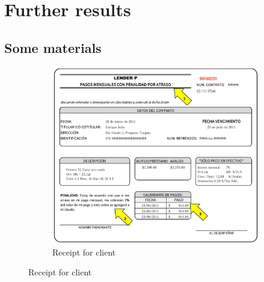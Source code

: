\documentclass[oneside,11pt]{article}
\begin{document}
\begingroup
\let\clearpage\relax
\tableofcontents
\endgroup


\newpage



\section{ Further results}
\vspace{.2in}


\subsection{Some materials}

\vspace{.1in}
\begin{figure}[H]
     \caption{Contract Terms Summary, and Promise Slip}
    \label{PaperSlip}
    \begin{center}
    \begin{subfigure}{0.65\textwidth}
    \caption{Receipt for client}
        \centering
        \includegraphics[width=\textwidth]{Figuras/TicketLenderP.png}
    \end{subfigure}
    

\end{center}
\end{figure}
\end{document}
